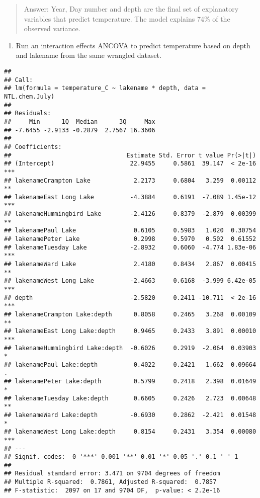 \documentclass[]{article}
\newenvironment{Shaded}{\begin{snugshade}}{\end{snugshade}}
\newcommand{\CommentTok}[1]{\textcolor[rgb]{0.56,0.35,0.01}{\textit{#1}}}
\newcommand{\DataTypeTok}[1]{\textcolor[rgb]{0.13,0.29,0.53}{#1}}
\newcommand{\KeywordTok}[1]{\textcolor[rgb]{0.13,0.29,0.53}{\textbf{#1}}}
\newcommand{\NormalTok}[1]{#1}
\newcommand{\OperatorTok}[1]{\textcolor[rgb]{0.81,0.36,0.00}{\textbf{#1}}}
\newcommand{\StringTok}[1]{\textcolor[rgb]{0.31,0.60,0.02}{#1}}
\providecommand{\tightlist}{%
  \setlength{\itemsep}{0pt}\setlength{\parskip}{0pt}}
\begin{document}
\begin{quote}
Answer: Year, Day number and depth are the final set of explanatory
variables that predict temperature. The model explains 74\% of the
observed variance.
\end{quote}

\begin{enumerate}
\def\labelenumi{\arabic{enumi}.}
\setcounter{enumi}{5}
\tightlist
\item
  Run an interaction effects ANCOVA to predict temperature based on
  depth and lakename from the same wrangled dataset.
\end{enumerate}

\begin{Shaded}
\end{Shaded}

\begin{verbatim}
## 
## Call:
## lm(formula = temperature_C ~ lakename * depth, data = NTL.chem.July)
## 
## Residuals:
##     Min      1Q  Median      3Q     Max 
## -7.6455 -2.9133 -0.2879  2.7567 16.3606 
## 
## Coefficients:
##                                Estimate Std. Error t value Pr(>|t|)    
## (Intercept)                     22.9455     0.5861  39.147  < 2e-16 ***
## lakenameCrampton Lake            2.2173     0.6804   3.259  0.00112 ** 
## lakenameEast Long Lake          -4.3884     0.6191  -7.089 1.45e-12 ***
## lakenameHummingbird Lake        -2.4126     0.8379  -2.879  0.00399 ** 
## lakenamePaul Lake                0.6105     0.5983   1.020  0.30754    
## lakenamePeter Lake               0.2998     0.5970   0.502  0.61552    
## lakenameTuesday Lake            -2.8932     0.6060  -4.774 1.83e-06 ***
## lakenameWard Lake                2.4180     0.8434   2.867  0.00415 ** 
## lakenameWest Long Lake          -2.4663     0.6168  -3.999 6.42e-05 ***
## depth                           -2.5820     0.2411 -10.711  < 2e-16 ***
## lakenameCrampton Lake:depth      0.8058     0.2465   3.268  0.00109 ** 
## lakenameEast Long Lake:depth     0.9465     0.2433   3.891  0.00010 ***
## lakenameHummingbird Lake:depth  -0.6026     0.2919  -2.064  0.03903 *  
## lakenamePaul Lake:depth          0.4022     0.2421   1.662  0.09664 .  
## lakenamePeter Lake:depth         0.5799     0.2418   2.398  0.01649 *  
## lakenameTuesday Lake:depth       0.6605     0.2426   2.723  0.00648 ** 
## lakenameWard Lake:depth         -0.6930     0.2862  -2.421  0.01548 *  
## lakenameWest Long Lake:depth     0.8154     0.2431   3.354  0.00080 ***
## ---
## Signif. codes:  0 '***' 0.001 '**' 0.01 '*' 0.05 '.' 0.1 ' ' 1
## 
## Residual standard error: 3.471 on 9704 degrees of freedom
## Multiple R-squared:  0.7861, Adjusted R-squared:  0.7857 
## F-statistic:  2097 on 17 and 9704 DF,  p-value: < 2.2e-16
\end{verbatim}
\end{document}
